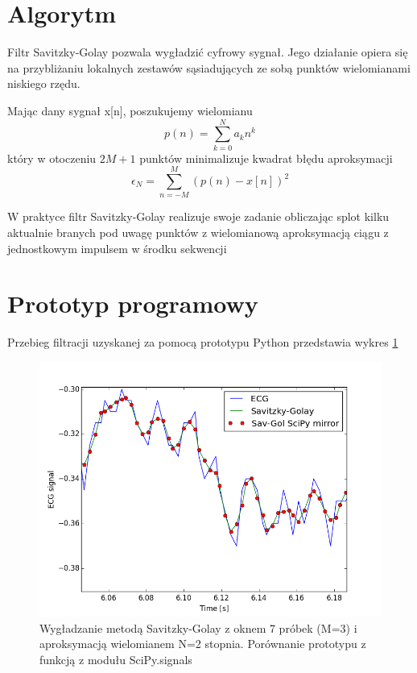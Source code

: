 \section{Algorytm}

Filtr Savitzky-Golay pozwala wygładzić cyfrowy sygnał. Jego działanie opiera się na przybliżaniu lokalnych zestawów sąsiadujących ze sobą punktów wielomianami niskiego rzędu.

Mając dany sygnał x[n], poszukujemy wielomianu
\begin{equation}
p(n) = \sum\limits_{k=0}^N a_k n^k
\end{equation}
który w otoczeniu $2M+1$ punktów minimalizuje kwadrat błędu aproksymacji
\begin{equation}
\epsilon_N = \sum\limits_{n=-M}^M (p(n) - x[n])^2
\end{equation}

W praktyce filtr Savitzky-Golay realizuje swoje zadanie obliczając splot kilku aktualnie branych pod uwagę punktów z wielomianową aproksymacją ciągu z jednostkowym impulsem w środku sekwencji 



\section{Prototyp programowy}



Przebieg filtracji uzyskanej za pomocą prototypu Python przedstawia wykres \ref{rys:savitzky_py}

\begin{figure}[!htb]
  \begin{center}
    \includegraphics[scale=0.8]
    {img/prototype.png}
  \end{center}
  \caption{Wygładzanie metodą Savitzky-Golay z oknem 7 próbek (M=3) i aproksymacją wielomianem N=2 stopnia. Porównanie prototypu z funkcją z modułu SciPy.signals}
  \label{rys:savitzky_py}
\end{figure}


